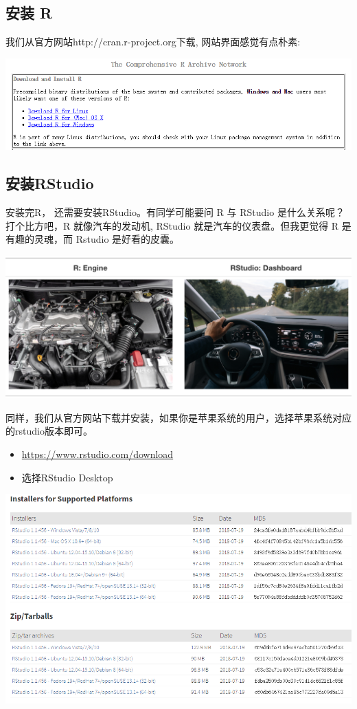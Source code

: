 \documentclass[
]{book}
\providecommand{\tightlist}{%
  \setlength{\itemsep}{0pt}\setlength{\parskip}{0pt}}
\begin{document}
\hypertarget{ux5b89ux88c5-r}{%
\subsection*{安装 R}\label{ux5b89ux88c5-r}}

我们从官方网站http://cran.r-project.org下载, 网站界面感觉有点朴素:

\includegraphics{figure/Rinstall.png}

\hypertarget{ux5b89ux88c5rstudio}{%
\subsection*{安装RStudio}\label{ux5b89ux88c5rstudio}}

安装完R， 还需要安装RStudio。有同学可能要问 R 与 RStudio 是什么关系呢？打个比方吧，R 就像汽车的发动机, RStudio 就是汽车的仪表盘。但我更觉得 R 是有趣的灵魂，而 Rstudio 是好看的皮囊。

\includegraphics{figure/2.png}

同样，我们从官方网站下载并安装，如果你是苹果系统的用户，选择苹果系统对应的rstudio版本即可。

\begin{itemize}
\tightlist
\item
  \url{https://www.rstudio.com/download}
\item
  选择RStudio Desktop
\end{itemize}

\includegraphics{figure/3.png}
\end{document}
